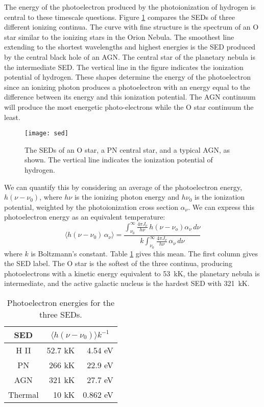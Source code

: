 \documentclass[debug, preprint, twocolumn]{rmaa}
\begin{document}
The energy of the  photoelectron produced by the photoionization of hydrogen
is central to these timescale questions. Figure \ref{fig:sed} compares the
 SEDs of three different ionizing continua.
The curve with fine structure is the spectrum of an O star 
similar to the ionizing stars in the Orion Nebula. 
The smoothest line extending to the shortest wavelengths and highest energies 
is the SED produced by the central black hole of an AGN. 
The central star of the planetary nebula is the intermediate SED. 
The vertical line in the figure indicates the ionization potential of hydrogen. 
These shapes determine the energy of the photoelectron 
since an ionizing photon produces a photoelectron with an energy equal to the 
difference between its energy and this ionization potential. 
The AGN continuum will produce the most energetic photo-electrons while 
the O star continuum the least.

\begin{figure}[t]
\texttt{[image: sed]}
\caption[Three SEDs]{The SEDs of an O star, a PN central star, and a typical AGN,
as shown.  The vertical line indicates the ionization potential of hydrogen.
\label{fig:sed}}
\end{figure}

We can quantify this  by considering an average of the photoelectron energy,
$h ( \nu - \nu_0)$, where $h \nu$ is the ionizing photon energy and  $h \nu_0$
is the ionization potential, 
weighted by the photoionization cross section $\alpha_{\nu}$.
We can express this photoelectron energy as 
an equivalent temperature:
\begin{equation}
\langle h (\nu - \nu_0 )\,  \alpha_\nu \rangle  = \frac{\int_{\nu_0}^{\infty}\frac{4 \pi J_{\nu}}{{h\nu}}\, h(\nu - \nu_o) \alpha_\nu\, d\nu}
{k \int_{\nu_0}^{\infty}\frac{4 \pi J_{\nu}}{{h\nu}}\, \alpha_\nu\, d\nu}
\end{equation}
where $k$ is Boltzmann's constant.
Table \ref{tab:PhotoElectronEnergy} gives this mean. 
The first column gives the SED label.
The O star is the softest of the three continua, producing photoelectrons with a
kinetic energy equivalent to 53~kK,
the planetary nebula is intermediate,
and the active galactic nucleus is the hardest SED with  321~kK. 

\begin{table}
\centering
\caption{Photoelectron energies for the three SEDs.}
\label{tab:PhotoElectronEnergy}
\null\smallskip
\renewcommand\arraystretch{0.65}
\begin{tabular}{ c r r}
\hline
SED&\multicolumn{2}{c}{$\langle h(\nu-\nu_0)\rangle k^{-1}$}\\
\hline
H II & 52.7 kK &  4.54 eV\\
PN   & 266  kK & 22.9 eV\\
AGN  & 321  kK & 27.7 eV\\
\hline
Thermal&10 kK & 0.862 eV\\
\hline
\end{tabular}
\end{table}
\end{document}
